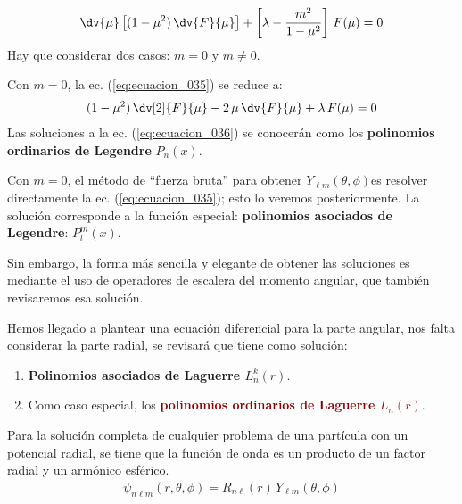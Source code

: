 \begin{align}
\dv{\mu} \left[ (1 - \mu^{2}) \, \dv{F}{\mu} \right] + \left[ \lambda - \dfrac{m^{2}}{1 - \mu^{2}} \right] \, F(\mu) = 0
\label{eq:ecuacion_035}
\end{align}
Hay que considerar dos casos: $m = 0$ y $m \neq 0$. 
\par
Con $m = 0$, la ec. (\ref{eq:ecuacion_035}) se reduce a:
\begin{align}
(1 - \mu^{2}) \, \dv[2]{F}{\mu} - 2  \, \mu \, \dv{F}{\mu} + \lambda \, F(\mu) = 0
\label{eq:ecuacion_036}
\end{align}
Las soluciones a la ec. (\ref{eq:ecuacion_036}) se conocerán como los \textbf{\textcolor{blue(munsell)}{polinomios ordinarios de Legendre}} $P_{n} (x)$.
\par
Con $m = 0$, el método de \enquote{fuerza bruta} para obtener $Y_{\ell m} (\theta, \phi)$es resolver directamente la ec. (\ref{eq:ecuacion_035}); esto lo veremos posteriormente. La solución corresponde a la función especial: \textbf{\textcolor{carmine}{polinomios asociados de Legendre}}: $P_{l}^{m} (x)$.
\par
Sin embargo, la forma más sencilla y elegante de obtener las soluciones es mediante el uso de operadores de escalera del momento angular, que también revisaremos esa solución.
\par
Hemos llegado a plantear una ecuación diferencial para la parte angular, nos falta considerar la parte radial, se revisará que tiene como solución:
\begin{enumerate}[label=\alph*)]
\item \textbf{\textcolor{bole}{Polinomios asociados de Laguerre $L_{n}^{k} (r)$}}.
\item Como caso especial, los \textbf{\textcolor{darkred}{polinomios ordinarios de Laguerre $L_{n} (r)$}}.\end{enumerate}
Para la solución completa de cualquier problema de una partícula con un potencial radial, se tiene que la función de onda es un producto de un factor radial y un armónico esférico.
\begin{align*}
\psi_{n \ell m} (r, \theta, \phi) = R_{n \ell} (r) \, Y_{\ell m} (\theta, \phi)
\end{align*}
